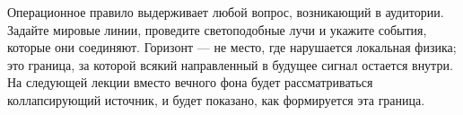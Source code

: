 \begin{classroomqa}
\end{classroomqa}

Операционное правило выдерживает любой вопрос, возникающий в аудитории. Задайте мировые линии, проведите светоподобные лучи и укажите события, которые они соединяют. Горизонт — не место, где нарушается локальная физика; это граница, за которой всякий направленный в будущее сигнал остается внутри. На следующей лекции вместо вечного фона будет рассматриваться коллапсирующий источник, и будет показано, как формируется эта граница.